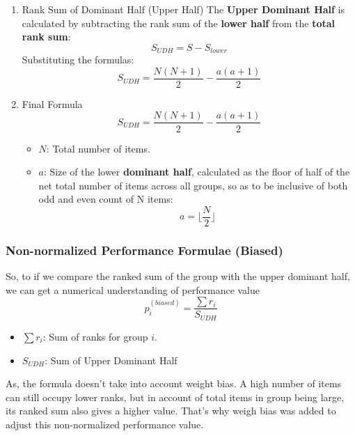 \documentclass[man,floatsintext]{apa7}
\begin{document}
\begin{enumerate}
\item{Rank Sum of Dominant Half (Upper Half)}
The \textbf{Upper Dominant Half} is calculated by subtracting the rank sum of the \textbf{lower half} from the \textbf{total rank sum}:
\begin{equation}
S_{UDH} = S - S_{lower}
\end{equation}
Substituting the formulas:
\begin{equation}
S_{UDH} = \frac{N(N + 1)}{2} - \frac{a(a+1)}{2}
\end{equation}

\item{Final Formula}
\begin{equation}
\label{eq:SUDH}
S_{UDH} = \frac{N(N + 1)}{2} - \frac{a(a+1)}{2}
\end{equation}

\begin{itemize}
  \item \( N \): Total number of items.
  \item \( a \): Size of the lower \textbf{dominant half}, calculated as the floor of half of the net total number of items across all groups, so as to be inclusive of both odd and even count of N items:
  \begin{equation}
  a = \lfloor \frac{N}{2} \rfloor
  \end{equation}
\end{itemize}
\end{enumerate}

\subsubsection*{Non-normalized Performance Formulae (Biased)}
So, to if we compare the ranked sum of the group with the upper dominant half, we can get a numerical understanding of performance value
\begin{equation}
\label{eq:p-biased}
    p_i^{(biased)} = \frac{\sum r_i}{ S_{UDH} }
\end{equation}
\begin{itemize}
    \item \textbf{$\sum r_i$}: Sum of ranks for group $i$.
    \item \textbf{$S_{UDH}$}: Sum of Upper Dominant Half
\end{itemize}

As, the formula doesn't take into account weight bias. A high number of items can still occupy lower ranks, but in account of total items in group being large, its ranked sum also gives a higher value. That's why weigh bias was added to adjust this non-normalized performance value.
\end{document}

